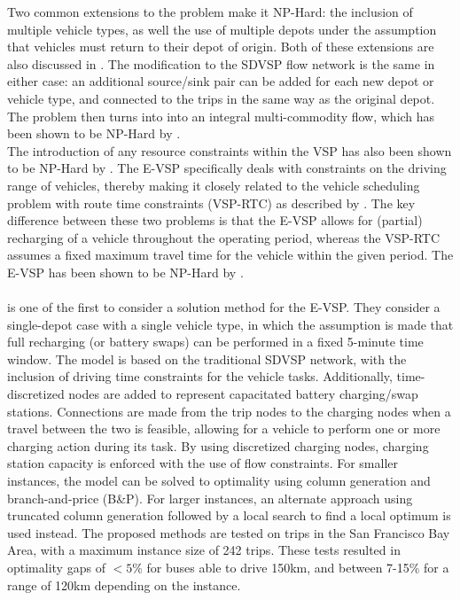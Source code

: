 \documentclass[]{article}
\begin{document}
Two common extensions to the problem make it NP-Hard: the inclusion of multiple vehicle types, as well the use of multiple depots under the assumption that vehicles must return to their depot of origin. Both of these extensions are also discussed in \citet{Bunte2009}. The modification to the SDVSP flow network is the same in either case: an additional source/sink pair can be added for each new depot or vehicle type, and connected to the trips in the same way as the original depot. The problem then turns into into an integral multi-commodity flow, which has been shown to be NP-Hard by \citet{Even1975}. \\
The introduction of any resource constraints within the VSP has also been shown to be NP-Hard by \citet{Bodin1983}. The E-VSP specifically deals with constraints on the driving range of vehicles, thereby making it closely related to the vehicle scheduling problem with route time constraints (VSP-RTC) as described by \citet{Haghani2002}. The key difference between these two problems is that the E-VSP allows for (partial) recharging of a vehicle throughout the operating period, whereas the VSP-RTC assumes a fixed maximum travel time for the vehicle within the given period. The E-VSP has been shown to be NP-Hard by \citet{Sassi2014}. \\\\
\citet{Li2014} is one of the first to consider a solution method for the E-VSP. They consider a single-depot case with a single vehicle type, in which the assumption is made that full recharging (or battery swaps) can be performed in a fixed 5-minute time window. The model is based on the traditional SDVSP network, with the inclusion of driving time constraints for the vehicle tasks. Additionally, time-discretized nodes are added to represent capacitated battery charging/swap stations. Connections are made from the trip nodes to the charging nodes when a travel between the two is feasible, allowing for a vehicle to perform one or more charging action during its task. By using discretized charging nodes, charging station capacity is enforced with the use of flow constraints. For smaller instances, the model can be solved to optimality using column generation and branch-and-price (B\&P). For larger instances, an alternate approach using truncated column generation followed by a local search to find a local optimum is used instead. The proposed methods are tested on trips in the San Francisco Bay Area, with a maximum instance size of 242 trips. These tests resulted in optimality gaps of $<5\%$ for buses able to drive 150km, and between 7-15\%  for a range of 120km depending on the instance. \\
\end{document}
